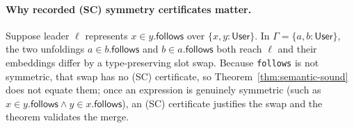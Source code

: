 \paragraph{Why recorded (SC) symmetry certificates matter.}
Suppose leader $\ell$ represents $x\in y.\mathsf{follows}$ over
$\{x,y:\mathsf{User}\}$. In $\Gamma=\{a,b:\mathsf{User}\}$, the two unfoldings
$a\in b.\mathsf{follows}$ and $b\in a.\mathsf{follows}$ both reach $\ell$ and
their embeddings differ by a type-preserving slot swap. Because \texttt{follows}
is not symmetric, that swap has no (SC) certificate, so
Theorem~\ref{thm:semantic-sound} does not equate them; once an expression is
genuinely symmetric (such as $x\in y.\mathsf{follows}\land y\in x.\mathsf{follows}$),
an (SC) certificate justifies the swap and the theorem validates the merge.
